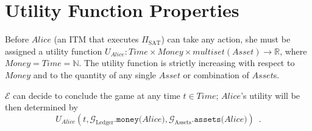 \section{Utility Function Properties}
  Before $Alice$ (an ITM that executes $\Pi_{\mathrm{SAT}}$) can take any action, she must
  be assigned a utility function $U_{Alice} : Time \times Money \times
  multiset\left(Asset\right) \rightarrow \mathbb{R}$, where $Money = Time = \mathbb{N}$.
  The utility function is strictly increasing with respect to $Money$ and to the quantity
  of any single $Asset$ or combination of $Asset$s.

  $\mathcal{E}$ can decide to conclude the game at any time $t \in Time$; $Alice$'s
  utility will be then determined by
  \begin{equation*}
    U_{Alice}\left(t, \mathcal{G}_{\mathrm{Ledger}}.\mathtt{money(}Alice\mathtt{)},
    \mathcal{G}_{\mathrm{Assets}}.\mathtt{assets(}Alice\mathtt{)}\right) \enspace.
  \end{equation*}
